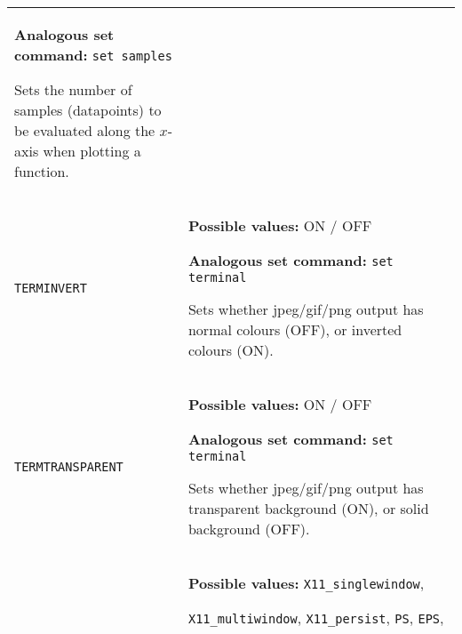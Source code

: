 \documentclass[a4paper,onecolumn,11pt]{book}
\begin{document}
\begin{longtable}{p{3.4cm}p{9cm}}
                   \textbf{Analogous set command:} \texttt{set samples}\index{set samples command@\texttt{set samples} command}

                   Sets the number of samples (datapoints) to be evaluated along the $x$-axis when plotting a function.
                   \\
\texttt{TERMINVERT} & \textbf{Possible values:} ON / OFF

                   \textbf{Analogous set command:} \texttt{set terminal}\index{set terminal command@\texttt{set terminal} command}

                   Sets whether jpeg/gif/png output has normal colours (OFF), or inverted colours (ON).
                   \\
\texttt{TERMTRANSPARENT} & \textbf{Possible values:} ON / OFF

                   \textbf{Analogous set command:} \texttt{set terminal}\index{set terminal command@\texttt{set terminal} command}

                   Sets whether jpeg/gif/png output has transparent background (ON), or solid background (OFF).
                   \\
\texttt{TERMTYPE} & \textbf{Possible values:} \texttt{X11\_singlewindow},

                   \texttt{X11\_multiwindow}, \texttt{X11\_persist}, \texttt{PS}, \texttt{EPS}, \texttt{PDF}, \texttt{PNG}, \texttt{JPG}, \texttt{GIF}

                   \textbf{Analogous set command:} \texttt{set terminal}\index{set terminal command@\texttt{set terminal} command}

                   Sets whether output is sent to the screen or to disk, and, in the latter case, the format of the output. The \texttt{ps} option should be used for both encapsulated and normal postscript output; these are distinguished using the \texttt{ENHANCED} option, above.
                   \\
\texttt{TEXTCOLOUR} & \textbf{Possible values:} Any recognised colour.

                   \textbf{Analogous set command:} \texttt{set textcolour}\index{set textcolour command@\texttt{set textcolour} command}

                   Sets the colour of all text output.
                   \\
\texttt{TEXTHALIGN} & \textbf{Possible values:} \texttt{Left}, \texttt{Centre}, \texttt{Right}


\end{longtable}
\end{document}
